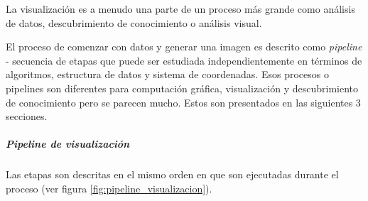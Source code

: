 \documentclass[12pt]{article}
\begin{document}
La visualización es a menudo una parte de un proceso más grande como análisis de datos, descubrimiento de conocimiento o análisis visual.

El proceso de comenzar con datos y generar una imagen es descrito como \textit{pipeline} - secuencia de etapas que puede ser estudiada independientemente en términos de algoritmos, estructura de datos y sistema de coordenadas. Esos procesos o pipelines son diferentes para computación gráfica, visualización y descubrimiento de conocimiento pero se parecen mucho. Estos son presentados en las siguientes 3 secciones.



\subparagraph{Pipeline de visualización}

Las etapas son descritas en el mismo orden en que son ejecutadas durante el proceso (ver figura \ref{fig:pipeline_visualizacion}).
\end{document}
